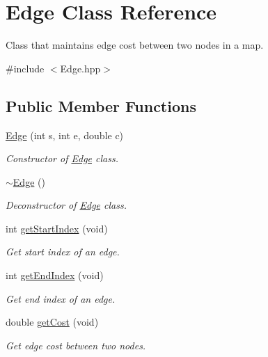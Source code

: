 \hypertarget{classEdge}{\section{Edge Class Reference}
\label{classEdge}
}


Class that maintains edge cost between two nodes in a map.  




{\ttfamily \#include $<$Edge.\-hpp$>$}

\subsection*{Public Member Functions}
\begin{DoxyCompactItemize}
\item 
\hyperlink{classEdge_a5374e98bee8b90e06da854f20f04fcd3}{Edge} (int s, int e, double c)
\begin{DoxyCompactList}\small\item\em Constructor of \hyperlink{classEdge}{Edge} class. \end{DoxyCompactList}\item 
\hyperlink{classEdge_a2f37b72f044427961d6730943daf10e0}{$\sim$\-Edge} ()
\begin{DoxyCompactList}\small\item\em Deconstructor of \hyperlink{classEdge}{Edge} class. \end{DoxyCompactList}\item 
int \hyperlink{classEdge_a348144efacdd4e840951e3563c8d6efa}{get\-Start\-Index} (void)
\begin{DoxyCompactList}\small\item\em Get start index of an edge. \end{DoxyCompactList}\item 
int \hyperlink{classEdge_a079b0d569e07f5588f6a6f75466e189c}{get\-End\-Index} (void)
\begin{DoxyCompactList}\small\item\em Get end index of an edge. \end{DoxyCompactList}\item 
double \hyperlink{classEdge_a4875fd6597dc34cdba634a73a7b5623b}{get\-Cost} (void)
\begin{DoxyCompactList}\small\item\em Get edge cost between two nodes. \end{DoxyCompactList}\end{DoxyCompactItemize}


